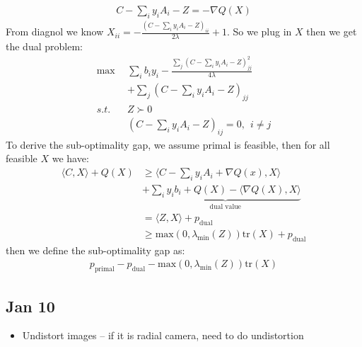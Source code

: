 \begin{itemize}
    \begin{align}
    C - \sum_i y_i A_i - Z = -\nabla Q(X)
    \end{align}
    From diagnol we know $X_{ii} = -\frac{(C - \sum_i y_i A_i - Z)_{ii}}{2\lambda} + 1$. So we plug in $X$ then we get the dual problem:
    \begin{align}
    \max ~~&\sum_i b_i y_i - \frac{\sum_j (C - \sum_i y_i A_i - Z)_{jj}^2}{4\lambda} 
    \\ & + \sum_j (C - \sum_i y_i A_i - Z)_{jj} \\
    s.t. ~~&Z \succ 0\\
         ~~&(C - \sum_i y_i A_i - Z)_{ij} = 0, ~~i\neq j    
    \end{align}
    To derive the sub-optimality gap, we assume primal is feasible, then for all feasible $X$ we have:
    \begin{align}
    \langle C, X \rangle + Q(X) &\geq \langle C - \sum_i y_i A_i + \nabla Q(x) , X \rangle \\
    &+ \underbrace{\sum_i y_i b_i + Q(X) - \langle \nabla Q(X), X \rangle}_{\text{dual value}}\\
    &= \langle Z, X \rangle + p_{\text{dual}}\\
    &\geq \text{max}(0,\lambda_{\text{min}}(Z)) \text{tr}(X) + p_{\text{dual}}
    \end{align}
    then we define the sub-optimality gap as:
    \begin{align}
    p_{\text{primal}} - p_{\text{dual}} - \text{max}(0,\lambda_{\text{min}}(Z)) \text{tr}(X)
    \end{align}
\end{itemize}

\subsection{Jan 10}
\begin{itemize}
    \item Undistort images -- if it is radial camera, need to do undistortion
\end{itemize}
